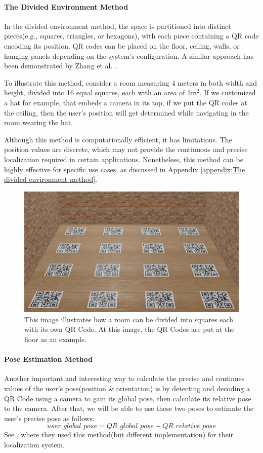 \paragraph{The Divided Environment Method}

In the divided environment method, the space is partitioned into distinct pieces(e.g., squares, triangles, or hexagons), with each piece containing a QR code encoding its position. QR codes can be placed on the floor, ceiling, walls, or hanging panels depending on the system's configuration. A similar approach has been demonstrated by Zhang et al. \cite{zhang2015}.

To illustrate this method, consider a room measuring 4 meters in both width and height, divided into 16 equal squares, each with an area of 1m$^2$. If we customized a hat for example, that embeds a camera in its top, if we put the QR codes at the ceiling, then the user’s position will get determined while navigating in the room wearing the hat.

Although this method is computationally efficient, it has limitations. The position values are discrete, which may not provide the continuous and precise localization required in certain applications. Nonetheless, this method can be highly effective for specific use cases, as discussed in Appendix \ref{appendix:The divided environment method}.

\begin{figure}[h]
	\includegraphics[width=\textwidth]{assets/ch2/Divided room for QR Codes.png}
	\caption{ This image illustrates how a room can be divided into squares each with its own QR Code. At this image, the QR Codes are put at the floor as an example. }
	\label{Divided room illustrative figure}
\end{figure}

\paragraph{Pose Estimation Method}
\label{Pose Estimation with QR Codes BG}
Another important and interesting way to calculate the precise and continues values of the user’s pose(position \& orientation) is by detecting and decoding a QR Code using a camera to gain its global pose, then calculate its relative pose to the camera. After that, we will be able to use these two poses to estimate the user’s precise pose as follows:
\[ user\_global\_pose = QR\_global\_pose - QR\_relative\_pose\]
See \cite{Lucag2017}, where they used this method(but different implementation) for their localization system.


